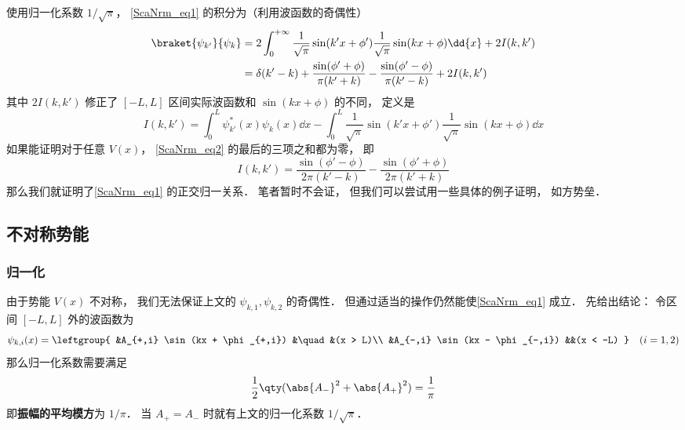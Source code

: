 使用归一化系数 $1/\sqrt{\pi}$， \autoref{ScaNrm_eq1} 的积分为（利用波函数的奇偶性）
\begin{equation}\label{ScaNrm_eq2}
\begin{aligned}
\braket{\psi_{k'}}{\psi_k} &= 2\int_{0}^{+\infty} \frac{1}{\sqrt{\pi}}\sin(k'x+\phi')\frac{1}{\sqrt{\pi}}\sin(kx+\phi) \dd{x} + 2I(k,k')\\
&= \delta(k'-k) + \frac{\sin(\phi'+\phi)}{\pi(k'+k)} - \frac{\sin(\phi'-\phi)}{\pi(k'-k)} + 2I(k,k')
\end{aligned}
\end{equation}
其中 $2I(k,k')$ 修正了 $[-L,L]$ 区间实际波函数和 $\sin(kx+\phi)$ 的不同， 定义是
\begin{equation}
I(k,k') = \int_0^L \psi_{k'}^*(x) \psi_k(x) \dd{x}
-\int_{0}^{L} \frac{1}{\sqrt{\pi}}\sin(k'x+\phi') \frac{1}{\sqrt{\pi}}\sin(kx+\phi) \dd{x}
\end{equation}
如果能证明对于任意 $V(x)$， \autoref{ScaNrm_eq2} 的最后的三项之和都为零， 即
\begin{equation}
I(k,k') = \frac{\sin(\phi'-\phi)}{2\pi(k'-k)} - \frac{\sin(\phi'+\phi)}{2\pi(k'+k)}
\end{equation}
那么我们就证明了\autoref{ScaNrm_eq1} 的正交归一关系． 笔者暂时不会证， 但我们可以尝试用一些具体的例子证明， 如方势垒．

\subsection{不对称势能}
\subsubsection{归一化}
由于势能 $V(x)$ 不对称， 我们无法保证上文的 $\psi_{k,1},\psi_{k,2}$ 的奇偶性． 但通过适当的操作仍然能使\autoref{ScaNrm_eq1} 成立． 先给出结论： 令区间 $[-L,L]$ 外的波函数为
\begin{equation}\label{ScaNrm_eq9}
\psi_{k,i}(x) = \leftgroup{
    &A_{+,i} \sin(kx + \phi_{+,i}) &\quad &(x > L)\\
    &A_{-,i} \sin(kx - \phi_{-,i}) &&(x < -L)
} \quad (i = 1,2)
\end{equation}
那么归一化系数需要满足
\begin{equation}\label{ScaNrm_eq4}
\frac{1}{2}\qty(\abs{A_-}^2 + \abs{A_+}^2) = \frac{1}{\pi}
\end{equation}
即\textbf{振幅的平均模方}为 $1/\pi$． 当 $A_+ = A_-$ 时就有上文的归一化系数 $1/\sqrt{\pi}$．

